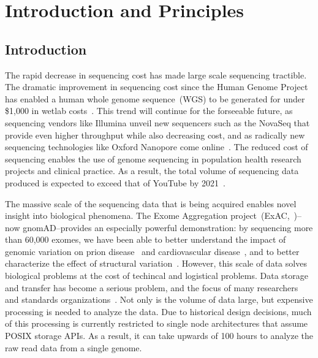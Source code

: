 \documentclass[phd]{ucbthesis}
\begin{document}
\tableofcontents

\mainmatter

\part{Introduction and Principles}

\chapter{Introduction}
\label{chap:introduction}

The rapid decrease in sequencing cost has made large scale sequencing
tractible. The dramatic improvement in sequencing cost since the Human
Genome Project has enabled a human whole genome sequence~(WGS) to be
generated for under \$1,000 in wetlab costs~\cite{nhgri}. This trend
will continue for the forseeable future, as sequencing vendors like
Illumina unveil new sequencers such as the NovaSeq that provide even
higher throughput while also decreasing cost, and as radically new
sequencing technologies like Oxford Nanopore come online~\cite{jain17}.
The reduced cost of sequencing enables the use of genome sequencing in
population health research projects and clinical practice. As a result,
the total volume of sequencing data produced is expected to exceed that
of YouTube by 2021~\cite{stephens15}.

The massive scale of the sequencing data that is being acquired enables
novel insight into biological phenomena. The Exome Aggregation
project~(ExAC,~\cite{lek16})--now gnomAD--provides an especially powerful
demonstration: by sequencing more than 60,000 exomes, we have been able
to better understand the impact of genomic variation on prion
disease~\cite{minikel16} and cardiovascular disease~\cite{walsh16}, and to
better characterize the effect of structural variation~\cite{ruderfer16}.
However, this scale of data solves biological problems at the cost of techincal
and logistical problems. Data storage and transfer has become a serious problem,
and the focus of many researchers~\cite{fritz11, kozanitis11} and standards
organizations~\cite{paten15}. Not only is the volume of data large, but
expensive processing is needed to analyze the data. Due to historical design
decisions, much of this processing is currently restricted to single node
architectures that assume POSIX storage APIs. As a result, it can take
upwards of 100 hours to analyze the raw read data from a single genome.
\end{document}
